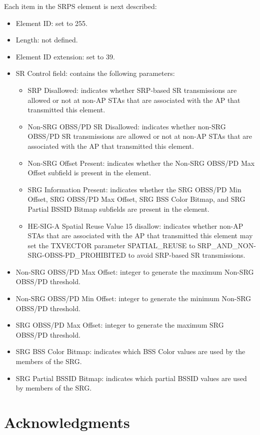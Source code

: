 \documentclass[preprint,12pt]{elsarticle}
\begin{document}
	Each item in the SRPS element is next described:
	\begin{itemize}
		\item Element ID: set to 255.
		\item Length: not defined.
		\item Element ID extension: set to 39.
		\item SR Control field: contains the following parameters:
		\begin{itemize}
			\item SRP Disallowed: indicates whether SRP-based SR transmissions are allowed or not at non-AP STAs that are associated with the AP that transmitted this element.
			\item Non-SRG OBSS/PD SR Disallowed: indicates whether non-SRG OBSS/PD SR transmissions are allowed or not at non-AP STAs that are associated with the AP that transmitted this element.
			\item Non-SRG Offset Present: indicates whether the Non-SRG OBSS/PD Max Offset subfield is present in the element.
			\item SRG Information Present: indicates whether the SRG OBSS/PD Min Offset, SRG OBSS/PD Max Offset, SRG BSS Color Bitmap, and SRG Partial BSSID Bitmap subfields are present in the element.
			\item HE-SIG-A Spatial Reuse Value 15 disallow: indicates whether non-AP STAs that are associated with the AP that transmitted this element may set the TXVECTOR parameter SPATIAL\_REUSE to SRP\_AND\_NON-SRG-OBSS-PD\_PROHIBITED to avoid SRP-based SR transmissions.
		\end{itemize}
		\item Non-SRG OBSS/PD Max Offset: integer to generate the maximum Non-SRG OBSS/PD threshold.
		\item Non-SRG OBSS/PD Min Offset: integer to generate the minimum Non-SRG OBSS/PD threshold.
		\item SRG OBSS/PD Max Offset: integer to generate the maximum SRG OBSS/PD threshold.
		\item SRG BSS Color Bitmap: indicates which BSS Color values are used by the members of the SRG.
		\item SRG Partial BSSID Bitmap: indicates which partial BSSID values are used by members of the SRG.
	\end{itemize}
	
	\section*{Acknowledgments}
	
\end{document}
